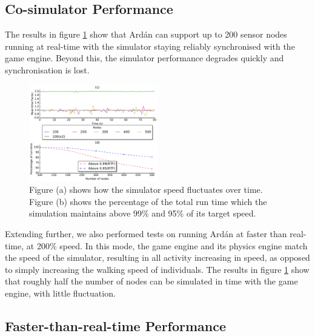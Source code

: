 \subsection{Co-simulator Performance} %
\label{sub:co_simulator_performance}

The results in figure \ref{fig:simulator_scalability} show that Ard\'{a}n can support up to 200 sensor nodes running at real-time with the simulator staying reliably synchronised with the game engine. Beyond this, the simulator performance degrades quickly and synchronisation is lost.

\begin{figure}[ht]
  \includegraphics[width=0.5\textwidth]{plots/plot2.pdf}
  \caption{Figure (a) shows how the simulator speed fluctuates over time. Figure (b) shows the percentage of the total run time which the simulation maintains above 99\% and 95\% of its target speed.}
  \label{fig:simulator_scalability}
\end{figure}

Extending further, we also performed tests on running Ard\'{a}n at faster than real-time, at 200\% speed. In this mode, the game engine and its physics engine match the speed of the simulator, resulting in all activity increasing in speed, as opposed to simply increasing the walking speed of individuals. The results in figure \ref{fig:simulator_scalability} show that roughly half the number of nodes can be simulated in time with the game engine, with little fluctuation.

\subsection{Faster-than-real-time Performance} %
\label{sub:faster_than_real_time_performance}



